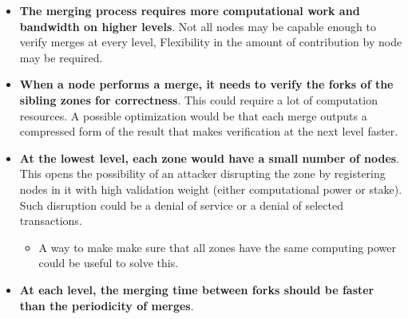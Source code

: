 \documentclass[portrait,ansidpaper,fontscale=0.445]{baposter} %
\begin{document}
\begin{poster}
{\begin{itemize}[leftmargin=1em]
    \item \textbf{The merging process requires more computational work and bandwidth on
        higher levels}.  Not all nodes may be capable enough to verify merges at
        every level,  Flexibility in the amount of contribution by node may be
        required.
    \item \textbf{When a node performs a merge, it needs to verify the forks of the
        sibling zones for correctness}.  This could require a lot of computation
        resources.  A possible optimization would be that each merge outputs a
        compressed form of the result that makes verification at the next level
        faster.
    \item \textbf{At the lowest level, each zone would have a small number of nodes}.
        This opens the possibility of an attacker disrupting the zone by
        registering nodes in it with high validation weight (either
        computational power or stake).  Such disruption could be a denial of
        service or a denial of selected transactions.
    \begin{itemize}[leftmargin=1em]
        \item A way to make make sure that all zones have the same computing
            power could be useful to solve this.
    \end{itemize}
    \item \textbf{At each level, the merging time between forks should be faster than the
        periodicity of merges}.
\end{itemize}

}



\end{poster}
\end{document}
